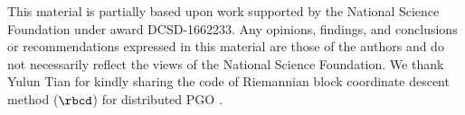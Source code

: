 This material is partially based upon work supported by the National Science Foundation under award DCSD-1662233. Any opinions, findings, and conclusions or recommendations expressed in this material are those of the authors and do not necessarily reflect the views of the National Science Foundation. We thank Yulun Tian for kindly sharing the code of Riemannian block coordinate descent method ($\rbcd$) for distributed PGO \cite{tian2019distributed}.